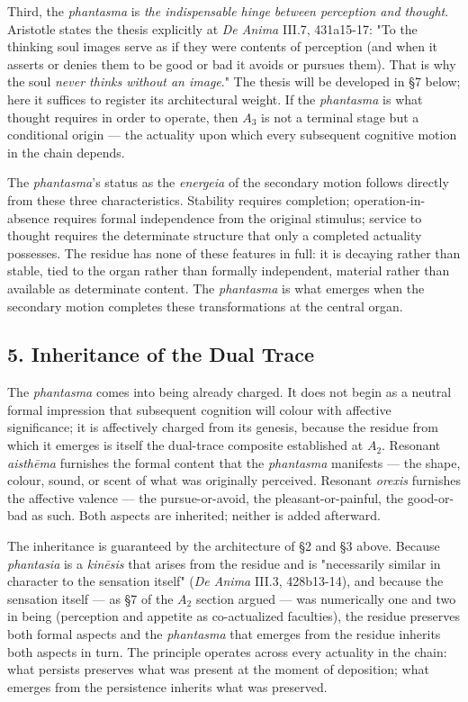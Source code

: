 \documentclass[12pt]{article}
\begin{document}
Third, the \textit{phantasma} is \textit{the indispensable hinge between perception and thought}. Aristotle states the thesis explicitly at \textit{De Anima} III.7, 431a15-17: "To the thinking soul images serve as if they were contents of perception (and when it asserts or denies them to be good or bad it avoids or pursues them). That is why the soul \textit{never thinks without an image}." The thesis will be developed in §7 below; here it suffices to register its architectural weight. If the \textit{phantasma} is what thought requires in order to operate, then $A_3$ is not a terminal stage but a conditional origin --- the actuality upon which every subsequent cognitive motion in the chain depends.

The \textit{phantasma}'s status as the \textit{energeia} of the secondary motion follows directly from these three characteristics. Stability requires completion; operation-in-absence requires formal independence from the original stimulus; service to thought requires the determinate structure that only a completed actuality possesses. The residue has none of these features in full: it is decaying rather than stable, tied to the organ rather than formally independent, material rather than available as determinate content. The \textit{phantasma} is what emerges when the secondary motion completes these transformations at the central organ.

\subsection*{5. Inheritance of the Dual Trace}

The \textit{phantasma} comes into being already charged. It does not begin as a neutral formal impression that subsequent cognition will colour with affective significance; it is affectively charged from its genesis, because the residue from which it emerges is itself the dual-trace composite established at $A_2$. Resonant \textit{aisthēma} furnishes the formal content that the \textit{phantasma} manifests --- the shape, colour, sound, or scent of what was originally perceived. Resonant \textit{orexis} furnishes the affective valence --- the pursue-or-avoid, the pleasant-or-painful, the good-or-bad as such. Both aspects are inherited; neither is added afterward.

The inheritance is guaranteed by the architecture of §2 and §3 above. Because \textit{phantasia} is a \textit{kinēsis} that arises from the residue and is "necessarily similar in character to the sensation itself" (\textit{De Anima} III.3, 428b13-14), and because the sensation itself --- as §7 of the $A_2$ section argued --- was numerically one and two in being (perception and appetite as co-actualized faculties), the residue preserves both formal aspects and the \textit{phantasma} that emerges from the residue inherits both aspects in turn. The principle operates across every actuality in the chain: what persists preserves what was present at the moment of deposition; what emerges from the persistence inherits what was preserved.
\end{document}
